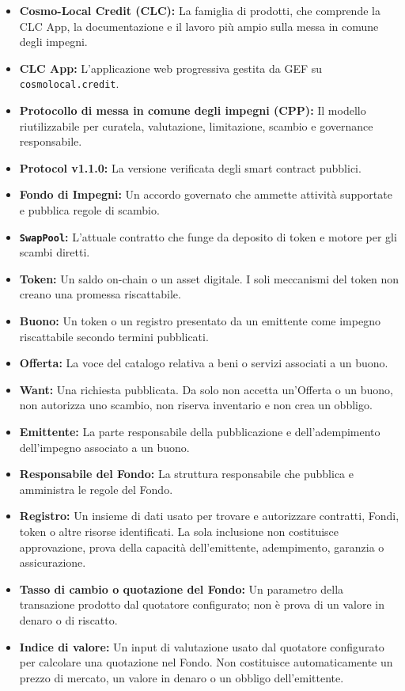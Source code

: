 \documentclass[11pt]{article}
\begin{document}
\begin{itemize}[leftmargin=*]
\item \textbf{Cosmo-Local Credit (CLC):} La famiglia di prodotti, che comprende la CLC App, la documentazione e il lavoro più ampio sulla messa in comune degli impegni.
\item \textbf{CLC App:} L'applicazione web progressiva gestita da GEF su \texttt{cosmolocal.credit}.
\item \textbf{Protocollo di messa in comune degli impegni (CPP):} Il modello riutilizzabile per curatela, valutazione, limitazione, scambio e governance responsabile.
\item \textbf{Protocol v1.1.0:} La versione verificata degli smart contract pubblici.
\item \textbf{Fondo di Impegni:} Un accordo governato che ammette attività supportate e pubblica regole di scambio.
\item \textbf{\texttt{SwapPool}:} L'attuale contratto che funge da deposito di token e motore per gli scambi diretti.
\item \textbf{Token:} Un saldo on-chain o un asset digitale. I soli meccanismi del token non creano una promessa riscattabile.
\item \textbf{Buono:} Un token o un registro presentato da un emittente come impegno riscattabile secondo termini pubblicati.
\item \textbf{Offerta:} La voce del catalogo relativa a beni o servizi associati a un buono.
\item \textbf{Want:} Una richiesta pubblicata. Da solo non accetta un'Offerta o un buono, non autorizza uno scambio, non riserva inventario e non crea un obbligo.
\item \textbf{Emittente:} La parte responsabile della pubblicazione e dell'adempimento dell'impegno associato a un buono.
\item \textbf{Responsabile del Fondo:} La struttura responsabile che pubblica e amministra le regole del Fondo.
\item \textbf{Registro:} Un insieme di dati usato per trovare e autorizzare contratti, Fondi, token o altre risorse identificati. La sola inclusione non costituisce approvazione, prova della capacità dell'emittente, adempimento, garanzia o assicurazione.
\item \textbf{Tasso di cambio o quotazione del Fondo:} Un parametro della transazione prodotto dal quotatore configurato; non è prova di un valore in denaro o di riscatto.
\item \textbf{Indice di valore:} Un input di valutazione usato dal quotatore configurato per calcolare una quotazione nel Fondo. Non costituisce automaticamente un prezzo di mercato, un valore in denaro o un obbligo dell'emittente.

\end{itemize}
\end{document}
